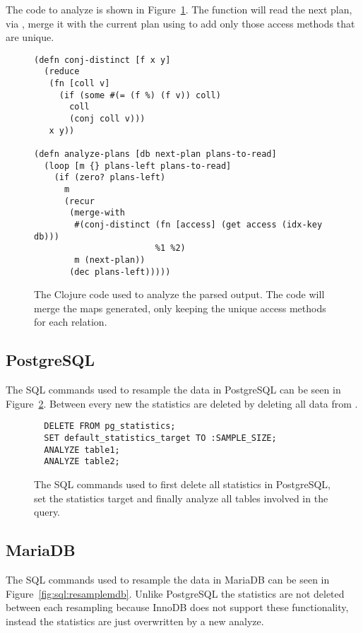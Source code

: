The code to analyze is shown in Figure~\ref{fig:clj:analyzing}. The
 function will read the next plan, via ,
merge it with the current plan using  to add only those
access methods that are unique.

\begin{figure}[ht]
\begin{verbatim}
(defn conj-distinct [f x y]
  (reduce
   (fn [coll v]
     (if (some #(= (f %) (f v)) coll)
       coll
       (conj coll v)))
   x y))

(defn analyze-plans [db next-plan plans-to-read]
  (loop [m {} plans-left plans-to-read]
    (if (zero? plans-left)
      m
      (recur
       (merge-with
        #(conj-distinct (fn [access] (get access (idx-key db)))
                        %1 %2)
        m (next-plan))
       (dec plans-left)))))
   \end{verbatim}
   \caption[The clojure code to analyze a query]{The Clojure code used to
     analyze the parsed output. The code will merge the maps generated, only
     keeping the unique access methods for each relation.}
\label{fig:clj:analyzing}
\end{figure}

\subsection{PostgreSQL}\label{sec:postgresql}
The SQL commands used to resample the data in PostgreSQL can be seen in
Figure~\ref{fig:sql:pganalyze}. Between every new  the statistics
are deleted by deleting all data from .

\begin{figure}[ht]
\begin{verbatim}
  DELETE FROM pg_statistics;
  SET default_statistics_target TO :SAMPLE_SIZE;
  ANALYZE table1;
  ANALYZE table2;
\end{verbatim}
\caption[The SQL commands used to resample inPostgreSQL.]{The SQL commands used
  to first delete all statistics in PostgreSQL, set the statistics target and
  finally analyze all tables involved in the query.}
\label{fig:sql:pganalyze}
\end{figure}

\subsection{MariaDB}\label{sec:mariadb}
The SQL commands used to resample the data in MariaDB can be seen in
Figure~\ref{fig:sql:resamplemdb}. Unlike PostgreSQL the statistics are not
deleted between each resampling because InnoDB does not support these
functionality, instead the statistics are just overwritten by a new analyze.

